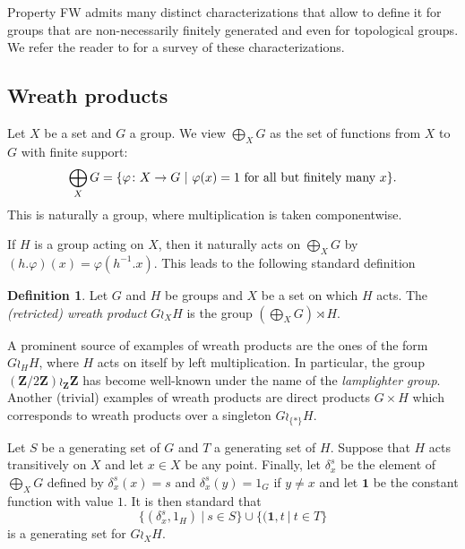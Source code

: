 \documentclass[a4paper]{article}
\theoremstyle{definition}
\newtheorem{defn}[lem]{Definition}
\theoremstyle{remark}%
\newcommand*{\field}[1]{\mathbf{#1}}
\newcommand*{\Z}{\field{Z}}
\newcommand{\setst}[2]{\{#1\ |\ #2\}}
\begin{document}
Property FW admits many distinct characterizations that allow to define it for groups that are non-necessarily finitely generated and even for topological groups. We refer the reader to \cite{Cornulier2013} for a survey of these characterizations.
%
%
%
%
%
%
%
%
%
%
\subsection{Wreath products}
%
%
%
%
%
Let $X$ be a set and $G$ a group. We view 
$\bigoplus_XG$ as the set of functions from $X$ to $G$ with finite support:
\[
	\bigoplus_XG=\setst{\varphi\colon X\to G}{\varphi(x)=1 \textnormal{ for all but finitely many }x}.
\]
This is naturally a group, where multiplication is taken componentwise.

If $H$ is a group acting on $X$, then it naturally acts on $\bigoplus_XG$
by $(h.\varphi)(x)=\varphi(h^{-1}.x)$.
This leads to the following standard definition
\begin{defn}\label{Def:WreathProd}
Let $G$ and $H$ be groups and $X$ be a set on which $H$ acts.
The \emph{(retricted) wreath product} $G\wr_XH$ is the group $(\bigoplus_XG)\rtimes H$.
\end{defn}
A prominent  source of examples of wreath products are the ones of the form $G\wr_HH$, where $H$ acts on itself by left multiplication.
In particular, the group $(\Z/2\Z)\wr_\Z\Z$ has become well-known under the name of the \emph{lamplighter group}.
Another (trivial) examples of wreath products are direct products $G\times H$ which corresponds to wreath products over a singleton $G\wr_{\{*\}}H$.

Let $S$ be a generating set of $G$ and $T$ a generating set of $H$.
Suppose that $H$ acts transitively on $X$ and let $x\in X$ be any point.
Finally, let $\delta_x^s$ be the element of $\bigoplus_XG$ defined by $\delta_x^s(x)=s$ and $\delta_x^s(y)=1_G$ if $y\neq x$ and let $\mathbf 1$ be the constant function with value $1$.
It is then standard that 
\[
	\setst{(\delta_x^s,1_H)}{s \in S} \cup \setst{(\mathbf 1,t}{t \in T}
\]
is a generating set for $G\wr_XH$.
\end{document}
